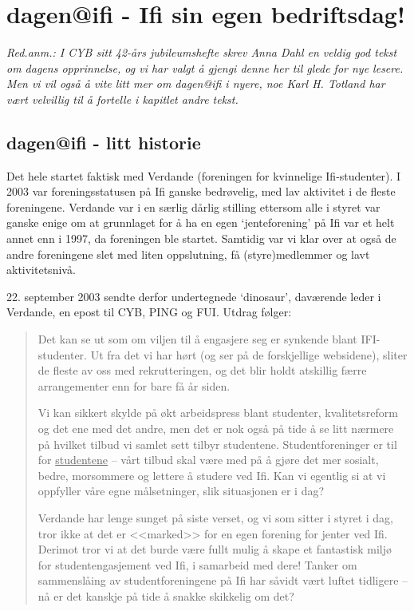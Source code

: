 \chapter{dagen@ifi - Ifi sin egen bedriftsdag!}

\textit{Red.anm.: I CYB sitt 42-års jubileumshefte skrev Anna Dahl en veldig god tekst om dagens opprinnelse, og vi har valgt å gjengi denne her til glede for nye lesere. Men vi vil også å vite litt mer om dagen@ifi i nyere, noe Karl H. Totland har vært velvillig til å fortelle i kapitlet andre tekst.}

\section{dagen@ifi - litt historie}

\author{Skrevet av Anna Dahl}

Det hele startet faktisk med Verdande (foreningen for kvinnelige Ifi-studenter). I 2003 var foreningsstatusen på Ifi ganske bedrøvelig, med lav aktivitet i de fleste foreningene. Verdande var i en særlig dårlig stilling ettersom alle i styret var ganske enige om at grunnlaget for å ha en egen `jenteforening' på Ifi var et helt annet enn i 1997, da foreningen ble startet. Samtidig var vi klar over at også de andre foreningene slet med liten oppslutning, få (styre)medlemmer og lavt aktivitetsnivå.

22. september 2003 sendte derfor undertegnede `dinosaur', daværende leder i Verdande, en epost til CYB, PING og FUI. Utdrag følger:

\begin{quote}
	Det kan se ut som om viljen til å engasjere seg er synkende blant IFI-studenter. Ut fra det vi har hørt (og ser på de forskjellige websidene), sliter de fleste av oss med rekrutteringen, og det blir holdt atskillig færre arrangementer enn for bare få år siden.
	
	Vi kan sikkert skylde på økt arbeidspress blant studenter, kvalitetsreform og det ene med det andre, men det er nok også på tide å se litt nærmere på hvilket tilbud vi samlet sett tilbyr studentene. Studentforeninger er til for \underline{studentene} -- vårt tilbud skal være med på å gjøre det mer sosialt, bedre, morsommere og lettere å studere ved Ifi. Kan vi egentlig si at vi oppfyller våre egne målsetninger, slik situasjonen er i dag?
	
	Verdande har lenge sunget på siste verset, og vi som sitter i styret i dag, tror ikke at det er <<marked>> for en egen forening for jenter ved Ifi. Derimot tror vi at det burde være fullt mulig å skape et fantastisk miljø for studentengasjement ved Ifi, i samarbeid med dere! Tanker om sammenslåing av studentforeningene på Ifi har såvidt vært luftet tidligere -- nå er det kanskje på tide å snakke skikkelig om det?
\end{quote}

